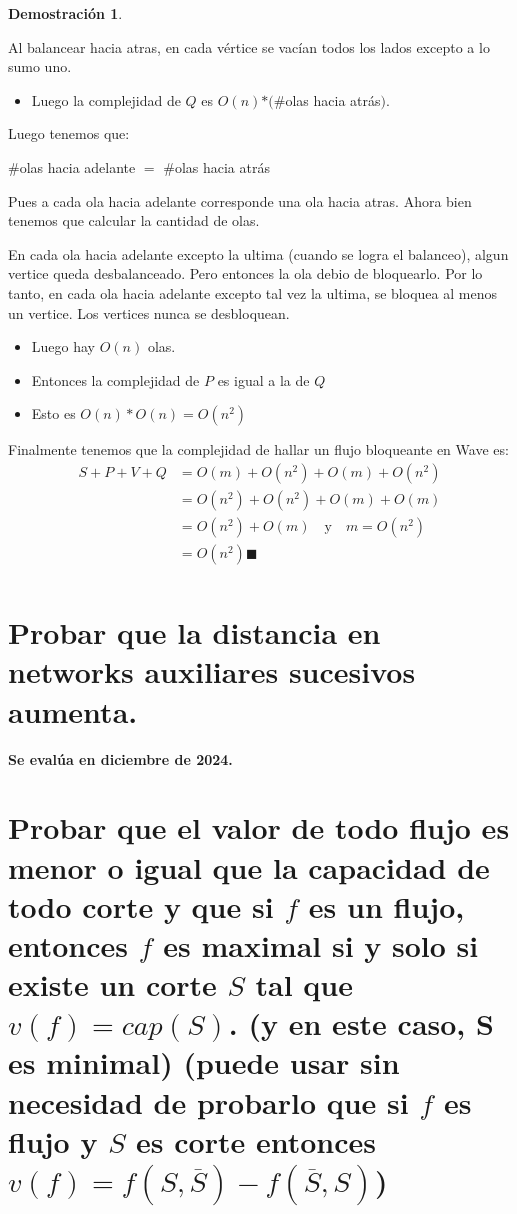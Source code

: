 \documentclass[11pt, a4paper]{article}
\theoremstyle{definition}
\newtheorem*{demostracion}{Demostración}
\begin{document}
\begin{demostracion}
\begin{itemize}
        Al balancear hacia atras, en cada vértice se vacían todos los lados excepto a lo sumo uno. 
        \begin{itemize}
            \item Luego la complejidad de $Q$ es $O(n)$$*$$(\#$olas hacia atrás$)$.
        \end{itemize}
        Luego tenemos que:
        \begin{center}
            $\#$olas hacia adelante $=$ $\#$olas hacia atrás
        \end{center}
        Pues a cada ola hacia adelante corresponde una ola hacia atras. Ahora bien tenemos que calcular la cantidad de olas.

        En cada ola hacia adelante excepto la ultima (cuando se logra el balanceo), algun vertice queda desbalanceado. 
        Pero entonces la ola debio de bloquearlo. Por lo tanto, en cada ola hacia adelante excepto tal vez la ultima, 
        se bloquea al menos un vertice. Los vertices nunca se desbloquean.
        \begin{itemize}
            \item Luego hay $O(n)$ olas.
            \item Entonces la complejidad de $P$ es igual a la de $Q$
            \item Esto es $O(n)*O(n) = O(n^2)$
        \end{itemize}
        Finalmente tenemos que la complejidad de hallar un flujo bloqueante en Wave es:
        \begin{align*}
            S+P+V+Q &= O(m) + O(n^2) + O(m) + O(n^2) \\[6pt]
            &= O(n^2) + O(n^2) + O(m) + O(m) \\[6pt]
            &= O(n^2) + O(m) \quad \text{y} \quad m=O(n^2) \\[6pt]
            &= O(n^2) \blacksquare \\[6pt]
        \end{align*}    
    \end{itemize}
\end{demostracion}

\section{Probar que la distancia en networks auxiliares sucesivos aumenta.}
\textbf{Se evalúa en diciembre de 2024.}

\section{Probar que el valor de todo flujo es menor o igual que la capacidad de todo corte y que si $f$ es un flujo, entonces $f$ es
maximal si y solo si existe un corte $S$ tal que $v(f )=cap(S)$. (y en este caso, S es minimal)
(puede usar sin necesidad de probarlo que si $f$ es flujo y $S$ es corte entonces $v(f )=f(S,\overline{S})-f(\overline{S}, S)$)}
\end{document}
